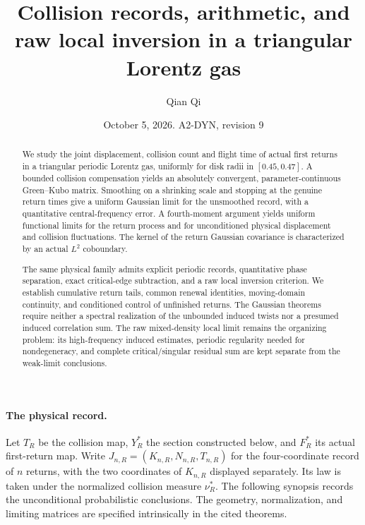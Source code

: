 \documentclass[11pt,reqno]{amsart}
\title[Collision records and raw local inversion]{Collision records, arithmetic, and raw local inversion in a triangular Lorentz gas}
\author{Qian Qi}
\date{October 5, 2026. A2-DYN, revision 9}
\numberwithin{equation}{section}
\theoremstyle{definition}\newtheorem{definition}[theorem]{Definition}
\theoremstyle{remark}\newtheorem{remark}[theorem]{Remark}
\begin{document}
\raggedbottom
\begin{abstract}
We study the joint displacement, collision count and flight time of
actual first returns in a triangular periodic Lorentz gas, uniformly
for disk radii in $[0.45,0.47]$. A bounded collision compensation yields
an absolutely convergent, parameter-continuous Green--Kubo matrix.
Smoothing on a shrinking scale and stopping at the genuine return
times give a uniform Gaussian limit for the unsmoothed record, with a
quantitative central-frequency error. A fourth-moment argument yields
uniform functional limits for the return process and for unconditioned
physical displacement and collision fluctuations. The kernel of the
return Gaussian covariance is characterized by an actual $L^2$
coboundary.

The same physical family admits explicit periodic records, quantitative
phase separation, exact critical-edge subtraction, and a raw local
inversion criterion. We establish cumulative return tails, common
renewal identities, moving-domain continuity, and conditioned control
of unfinished returns. The Gaussian theorems require neither a spectral
realization of the unbounded induced twists nor a presumed induced
correlation sum. The raw mixed-density local limit remains the organizing
problem: its high-frequency induced estimates, periodic regularity
needed for nondegeneracy, and complete critical/singular residual sum
are kept separate from the weak-limit conclusions.
\end{abstract}
\maketitle

\paragraph{The physical record.}
Let $T_R$ be the collision map, $Y_R^*$ the section constructed below,
and $F_R^*$ its actual first-return map. Write
$J_{n,R}=(K_{n,R},N_{n,R},T_{n,R})$ for the four-coordinate record of
$n$ returns, with the two coordinates of $K_{n,R}$ displayed separately.
Its law is taken under the normalized collision measure $\nu_R^*$.
The following synopsis records the unconditional probabilistic
conclusions. The geometry, normalization, and limiting matrices are
specified intrinsically in the cited theorems.
\end{document}
